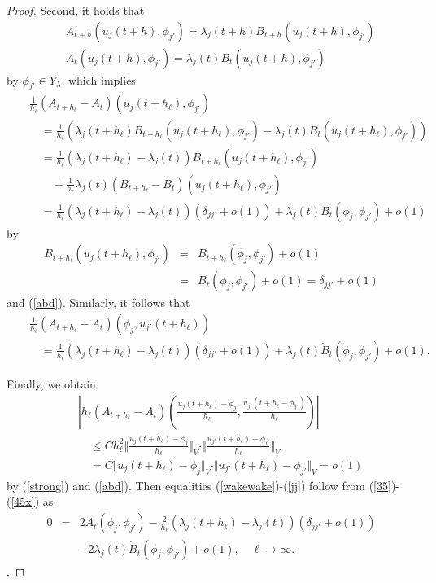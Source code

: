 \documentclass[final,a4paper]{jmsj}
\theoremstyle{thmstyleone}%
\theoremstyle{thmstyletwo}%
\theoremstyle{thmstylethree}%
\begin{document}
\begin{proof}
Second, it holds that 
\begin{eqnarray*} 
& & A_{t+h}(u_j(t+h), \phi_{j'})=\lambda_j(t+h)B_{t+h}(u_j(t+h), \phi_{j'}) \\ 
& & A_{t}(u_j(t+h), \phi_{j'})=\lambda_j(t)B_{t}(u_j(t+h), \phi_{j'}) 
\end{eqnarray*} 
by $\phi_{j'}\in Y_\lambda$, which implies     
\begin{eqnarray} 
& & \frac{1}{h_\ell}(A_{t+h_\ell}-A_{t})(u_j(t+h_\ell), \phi_{j'}) \nonumber\\ 
& & \quad =\frac{1}{h_\ell}(\lambda_j(t+h_\ell)B_{t+h_\ell}(u_j(t+h_\ell), \phi_{j'})-\lambda_j(t)B_{t}(u_j(t+h_\ell), \phi_{j'})) \nonumber\\ 
& & \quad =\frac{1}{h_\ell}(\lambda_j(t+h_\ell)-\lambda_j(t))B_{t+h_\ell}(u_j(t+h_\ell), \phi_{j'}) \nonumber\\ 
& & \qquad +\frac{1}{h_\ell}\lambda_j(t)(B_{t+h_\ell}-B_{t})(u_j(t+h_\ell),\phi_{j'}) \nonumber\\ 
& & \quad =  \frac{1}{h_\ell}(\lambda_j(t+h_\ell)-\lambda_j(t))(\delta_{jj'}+o(1))+ \lambda_j(t)\dot B_{t}(\phi_j, \phi_{j'})+o(1) 
\end{eqnarray} 
by 
\begin{eqnarray*} 
B_{t+h_\ell}(u_j(t+h_\ell), \phi_{j'}) & = & B_{t+h_\ell}(\phi_j, \phi_{j'})+o(1) \\ 
& = & B_t(\phi_j, \phi_{j'})+o(1) =\delta_{jj'}+o(1) 
\end{eqnarray*} 
and (\ref{abd}). Similarly, it follows that   
\begin{eqnarray} 
& & \frac{1}{h_\ell}(A_{t+h_\ell}-A_{t})(\phi_j, u_{j'}(t+h_\ell)) \nonumber\\ 
& & \quad =\frac{1}{h_\ell}(\lambda_j(t+h_\ell)-\lambda_j(t))(\delta_{jj'}+o(1))+
\lambda_j(t)\dot B_{t}(\phi_j, \phi_{j'})+o(1).  
 \label{43}
\end{eqnarray} 

Finally, we obtain   
\begin{eqnarray} 
& & \left\vert h_\ell(A_{t+h_\ell}-A_{t})(\frac{u_j(t+h_\ell)-\phi_j}{h_\ell}, \frac{u_{j'}(t+h_\ell-\phi_{j'})}{h_\ell})\right\vert \nonumber\\ 
& & \quad \leq Ch_\ell^2\Vert \frac{u_j(t+h_\ell)-\phi_j}{h_\ell}\Vert_V\cdot \Vert \frac{u_{j'}(t+h_\ell)-\phi_{j'}}{h_\ell}\Vert_V \nonumber\\ 
& & \quad = C\Vert u_j(t+h_\ell)-\phi_j\Vert_V\cdot \Vert u_{j'}(t+h_\ell)-\phi_{j'}\Vert_V =o(1) 
 \label{45x}
\end{eqnarray} 
by (\ref{strong}) and (\ref{abd}). Then equalities (\ref{wakewake})-(\ref{jj}) follow from (\ref{35})-(\ref{45x}) as 
\begin{eqnarray*} 
0 & = & 2\dot A_t(\phi_j, \phi_{j'})-\frac{2}{h_\ell}(\lambda_j(t+h_\ell)-\lambda_j(t))(\delta_{jj'}+o(1)) \\ 
& & -2\lambda_j(t)\dot B_t(\phi_j, \phi_{j'})+o(1), \quad \ell\rightarrow \infty.  
\end{eqnarray*} .    
\end{proof} 
\end{document}
